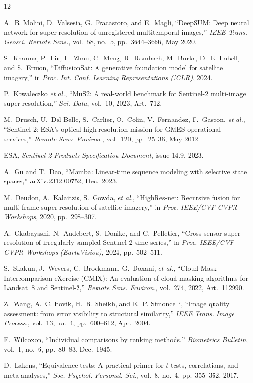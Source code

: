 \documentclass[journal]{IEEEtran}
\begin{document}
\begin{thebibliography}{12}

A.~B. Molini, D.~Valsesia, G.~Fracastoro, and E.~Magli, ``DeepSUM: Deep neural
network for super-resolution of unregistered multitemporal images,'' \emph{IEEE
Trans. Geosci. Remote Sens.}, vol.~58, no.~5, pp.~3644--3656, May 2020.

S.~Khanna, P.~Liu, L.~Zhou, C.~Meng, R.~Rombach, M.~Burke, D.~B. Lobell, and
S.~Ermon, ``DiffusionSat: A generative foundation model for satellite imagery,''
in \emph{Proc. Int. Conf. Learning Representations (ICLR)}, 2024.

P.~Kowaleczko \emph{et al.}, ``MuS2: A real-world benchmark for Sentinel-2
multi-image super-resolution,'' \emph{Sci. Data}, vol.~10, 2023, Art.~712.

M.~Drusch, U.~Del Bello, S.~Carlier, O.~Colin, V.~Fernandez, F.~Gascon,
\emph{et al.}, ``Sentinel-2: ESA's optical high-resolution mission for GMES
operational services,'' \emph{Remote Sens. Environ.}, vol.~120, pp.~25--36,
May 2012.

ESA, \emph{Sentinel-2 Products Specification Document}, issue 14.9, 2023.

A.~Gu and T.~Dao, ``Mamba: Linear-time sequence modeling with selective state
spaces,'' arXiv:2312.00752, Dec.~2023.

M.~Deudon, A.~Kalaitzis, S.~Gowda, \emph{et al.}, ``HighRes-net: Recursive fusion
for multi-frame super-resolution of satellite imagery,'' in \emph{Proc. IEEE/CVF
CVPR Workshops}, 2020, pp.~298--307.

A.~Okabayashi, N.~Audebert, S.~Donike, and C.~Pelletier, ``Cross-sensor
super-resolution of irregularly sampled Sentinel-2 time series,'' in \emph{Proc.
IEEE/CVF CVPR Workshops (EarthVision)}, 2024, pp.~502--511.

S.~Skakun, J.~Wevers, C.~Brockmann, G.~Doxani, \emph{et al.}, ``Cloud Mask
Intercomparison eXercise (CMIX): An evaluation of cloud masking algorithms for
Landsat~8 and Sentinel-2,'' \emph{Remote Sens. Environ.}, vol.~274, 2022,
Art.~112990.

Z.~Wang, A.~C. Bovik, H.~R. Sheikh, and E.~P. Simoncelli, ``Image quality
assessment: from error visibility to structural similarity,'' \emph{IEEE Trans.
Image Process.}, vol.~13, no.~4, pp.~600--612, Apr.~2004.

F.~Wilcoxon, ``Individual comparisons by ranking methods,'' \emph{Biometrics
Bulletin}, vol.~1, no.~6, pp.~80--83, Dec.~1945.

D.~Lakens, ``Equivalence tests: A practical primer for $t$ tests, correlations,
and meta-analyses,'' \emph{Soc. Psychol. Personal. Sci.}, vol.~8, no.~4,
pp.~355--362, 2017.

\end{thebibliography}
\end{document}

